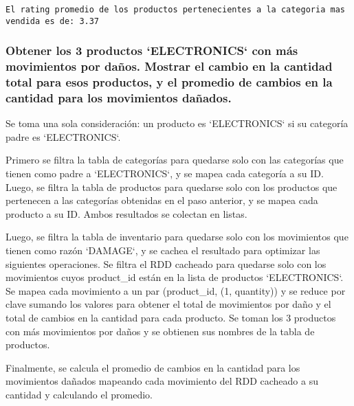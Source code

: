 \begin{lstlisting}[style=console, caption=Resultados de la consulta 4 propuesta propia, label={lst:propia_q4_results}, xleftmargin=5pt, xrightmargin=5pt]
El rating promedio de los productos pertenecientes a la categoria mas vendida es de: 3.37
\end{lstlisting}

\subsubsection{Obtener los 3 productos `ELECTRONICS` con más movimientos por daños. Mostrar el cambio en la cantidad total para esos productos, y el promedio de cambios en la cantidad para los movimientos dañados.}
Se toma una sola consideración: un producto es `ELECTRONICS` si su categoría padre es `ELECTRONICS`.

Primero se filtra la tabla de categorías para quedarse solo con las categorías que tienen como padre a `ELECTRONICS`, y se mapea cada categoría a su ID. Luego, se filtra la tabla de productos para quedarse solo con los productos que pertenecen a las categorías obtenidas en el paso anterior, y se mapea cada producto a su ID. Ambos resultados se colectan en listas.

Luego, se filtra la tabla de inventario para quedarse solo con los movimientos que tienen como razón `DAMAGE`, y se cachea el resultado para optimizar las siguientes operaciones. Se filtra el RDD cacheado para quedarse solo con los movimientos cuyos product\_id están en la lista de productos `ELECTRONICS`. Se mapea cada movimiento a un par (product\_id, (1, quantity)) y se reduce por clave sumando los valores para obtener el total de movimientos por daño y el total de cambios en la cantidad para cada producto. Se toman los 3 productos con más movimientos por daños y se obtienen sus nombres de la tabla de productos.

Finalmente, se calcula el promedio de cambios en la cantidad para los movimientos dañados mapeando cada movimiento del RDD cacheado a su cantidad y calculando el promedio.
    

